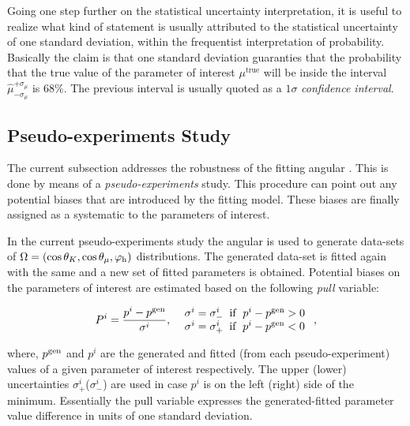 Going one step further on the statistical uncertainty interpretation, it is useful to realize what kind of statement is
usually attributed to the statistical uncertainty of one standard deviation, within the frequentist interpretation of
probability. Basically the claim is that one standard deviation guaranties that the probability that the true value
of the parameter of interest $\mu^{\text{true}}$ will be inside the interval $\hat{\mu}_{-\sigma_\mu}^{+\sigma_\mu}$ is $68\%$.
The previous interval is usually quoted as a $1\sigma$ {\it confidence interval}.


\subsection{Pseudo-experiments Study}
\label{Toy_Experiments_Study}

The current subsection addresses the robustness of the fitting angular \pdf.
This is done by means of a  {\it pseudo-experiments} study. This procedure
can point out any potential biases that are introduced by the fitting model.
These biases are finally assigned as a systematic to the parameters of interest.

In the current pseudo-experiments study the angular \pdf is used to generate data-sets of $\Omega = (\cos\theta_{K},\cos\theta_{\mu},\varphi_{\rm h})$
distributions. The generated data-set is fitted again with the same \pdf and a new set of fitted parameters is obtained. Potential
biases on the parameters of interest are estimated based on the following {\it pull} variable:

\begin{equation}
P^i = \frac{p^i - p^{\rm gen}}{ \sigma^i },\;\;\left.
  \begin{array}{ll}
    \sigma^i = \sigma^i_- \;\;{\rm if}\;\; p^i - p^{\rm gen} > 0   \\
    \sigma^i = \sigma^i_+ \;\;{\rm if}\;\; p^i - p^{\rm gen} < 0
  \end{array} \right. ,
\label{pull_def}
\end{equation}

\noindent where, $p^{\rm gen}$ and $p^i$ are the generated and fitted (from each pseudo-experiment) values of a given parameter of interest
respectively. The upper (lower) uncertainties $\sigma^i_+$($\sigma^i_-$) are used in case $p^i$ is on the left (right) side of the minimum.
Essentially the pull variable expresses the generated-fitted parameter value difference in units of one standard deviation.


